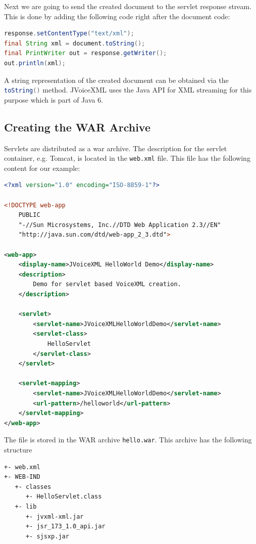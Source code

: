 \documentclass[11pt,a4paper]{article}
\begin{document}
Next we are going to send the created document to the servlet response stream.
This is done by adding the following code right after the document code:

\begin{lstlisting}[language=Java]
response.setContentType("text/xml");
final String xml = document.toString();
final PrintWriter out = response.getWriter();
out.println(xml);
\end{lstlisting}

A string representation of the created document can be obtained via the
\lstinline[language=Java]{toString()} method. JVoiceXML uses the Java API for
XML streaming for this purpose which is part of Java 6.

\subsection{Creating the WAR Archive}

Servlets are distributed as a war archive. The description for the servlet
container, e.g. Tomcat, is located in the \texttt{web.xml} file.
This file has the following content for our example:

\begin{lstlisting}[language=XML]
<?xml version="1.0" encoding="ISO-8859-1"?>

<!DOCTYPE web-app
    PUBLIC
    "-//Sun Microsystems, Inc.//DTD Web Application 2.3//EN"
    "http://java.sun.com/dtd/web-app_2_3.dtd">

<web-app>
    <display-name>JVoiceXML HelloWorld Demo</display-name>
    <description>
        Demo for servlet based VoiceXML creation.
    </description>

    <servlet>
        <servlet-name>JVoiceXMLHelloWorldDemo</servlet-name>
        <servlet-class>
            HelloServlet
        </servlet-class>
    </servlet>

    <servlet-mapping>
        <servlet-name>JVoiceXMLHelloWorldDemo</servlet-name>
        <url-pattern>/helloworld</url-pattern>
    </servlet-mapping>
</web-app>
\end{lstlisting}

The file is stored in the WAR archive \texttt{hello.war}. This archive has the
following structure
\begin{lstlisting}
+- web.xml
+- WEB-IND
   +- classes
      +- HelloServlet.class
   +- lib
      +- jvxml-xml.jar
      +- jsr_173_1.0_api.jar
      +- sjsxp.jar
\end{lstlisting}
\end{document}

